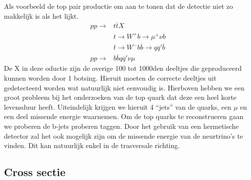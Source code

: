 \documentclass[../main.tex]{subfiles}
\begin{document}
Als voorbeeld de top pair productie om aan te tonen dat de detectie niet zo makkelijk is als het lijkt.
\begin{equation}
    \begin{aligned}
        \label{eq:top_prod}
        pp \rightarrow &t\overline t X\\
                       &t\rightarrow W^+b\rightarrow \mu^+\nu b\\
                       &\overline t \rightarrow W^-b\overline b \rightarrow q\overline q' \overline b\\
        pp \rightarrow &b\overline bq\overline q' \nu\mu
    \end{aligned}
\end{equation}
De X in deze oductie zijn de overige 100 tot 1000den deeltjes die geproduceerd kunnen worden door 1 botsing. Hieruit moeten de correcte deeltjes uit gedetecteerd worden wat natuurlijk niet eenvoudig is. Hierboven hebben we een groot probleem bij het onderzoeken van de top quark dat deze een heel korte levensduur heeft. Uiteindelijk krijgen we hieruit 4 ``jets'' van de quarks, een $\mu$ en een deel missende energie waarnemen. Om de top quarks te reconstrueren gaan we proberen de b-jets proberen taggen. Door het gebruik van een hermetische detector zal het ook mogelijk zijn om de missende energie van de neurtrino's te vinden. Dit kan natuurlijk enkel in de trasversale richting.

\subsection{Cross sectie}%
\label{sub:cross_sectie}
\end{document}
